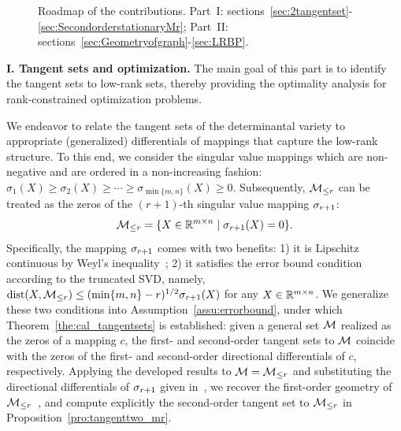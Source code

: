 \begin{figure}[htbp]
\begin{minipage}{1\textwidth}
\end{minipage}
\caption{Roadmap of the contributions. Part~I: sections~\ref{sec:2tangentset}-\ref{sec:SecondorderstationaryMr}; Part~II: sections~\ref{sec:Geometryofgraph}-\ref{sec:LRBP}.}
\label{fig:twocontributions}
\end{figure}


\medskip

\noindent\textbf{I. Tangent sets and optimization.} The main goal of this part is to identify the tangent sets to low-rank sets, thereby providing the optimality analysis for rank-constrained optimization problems.

We endeavor to relate the tangent sets of the determinantal variety to appropriate (generalized) differentials of mappings that capture the low-rank structure. To this end, we consider the singular value mappings which are non-negative and are ordered in a non-increasing fashion: $\sigma_1(X)\ge\sigma_2(X)\ge\cdots\ge\sigma_{\min\{m,n\}}(X)\ge 0$. Subsequently, $\mathcal{M}_{\le r}$ can be treated as the zeros of the $(r+1)$-th singular value mapping $\sigma_{r+1}$:
\begin{equation*}
    \mathcal{M}_{\le r}=\{X\in\mathbb{R}^{m\times n}\mid\sigma_{r+1}(X)=0\}.
\end{equation*}
Specifically, the mapping $\sigma_{r+1}$ comes with two benefits: 1) it is Lipschitz continuous by Weyl's inequality~\cite{weyl1912inequality}; 2) it satisfies the error bound condition according to the truncated SVD, namely, $\operatorname{dist}(X,\mathcal{M}_{\le r})\le (\min\{m,n\}-r)^{1/2} \sigma_{r+1}(X)$ for any $X\in\mathbb{R}^{m\times n}$. We generalize these two conditions into Assumption~\ref{assu:errorbound}, under which Theorem~\ref{the:cal_tangentsets} is established: given a general set $\mathcal{M}$ realized as the zeros of a mapping $c$, the first- and second-order tangent sets to $\mathcal{M}$ coincide with the zeros of the first- and second-order directional differentials of $c$, respectively. Applying the developed results to $\mathcal{M}=\mathcal{M}_{\le r}$ and substituting the directional differentials of $\sigma_{r+1}$ given in~\cite{zhang2013secondordersingular}, we recover the first-order geometry of $\mathcal{M}_{\le r}$~\cite{schneider2015Lojaconvergence}, and compute explicitly the second-order tangent set to $\mathcal{M}_{\le r}$ in Proposition~\ref{pro:tangenttwo_mr}. 

